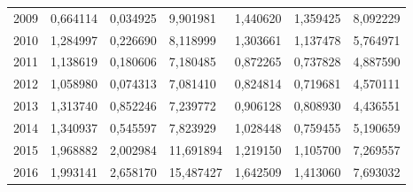 \begin{table}
\begin{tabular}{p{1cm}p{2cm}p{2cm}p{2cm}p{2cm}p{2cm}p{2cm}}
 2009 &                            0,664114 & 0,034925 &                                    9,901981 &                            1,440620 &                                     1,359425 &                    8,092229 \\
 2010 &                            1,284997 & 0,226690 &                                    8,118999 &                            1,303661 &                                     1,137478 &                    5,764971 \\
 2011 &                            1,138619 & 0,180606 &                                    7,180485 &                            0,872265 &                                     0,737828 &                    4,887590 \\
 2012 &                            1,058980 & 0,074313 &                                    7,081410 &                            0,824814 &                                     0,719681 &                    4,570111 \\
 2013 &                            1,313740 & 0,852246 &                                    7,239772 &                            0,906128 &                                     0,808930 &                    4,436551 \\
 2014 &                            1,340937 & 0,545597 &                                    7,823929 &                            1,028448 &                                     0,759455 &                    5,190659 \\
 2015 &                            1,968882 & 2,002984 &                                   11,691894 &                            1,219150 &                                     1,105700 &                    7,269557 \\
 2016 &                            1,993141 & 2,658170 &                                   15,487427 &                            1,642509 &                                     1,413060 &                    7,693032 \\
\bottomrule
\end{tabular}
\end{table}
